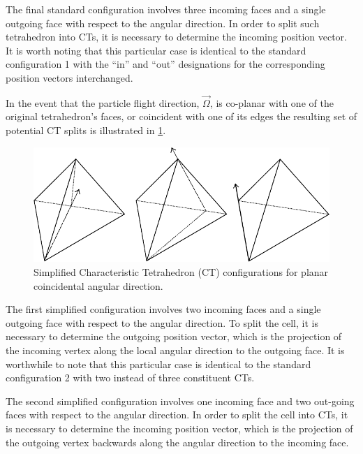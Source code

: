 The final standard configuration involves three incoming faces and a single outgoing face with respect to the angular direction. In order to split such tetrahedron into CTs, it is necessary to determine the incoming position vector. It is worth noting that this particular case is identical to the standard configuration 1 with the “in” and “out” designations for the corresponding position vectors interchanged.

In the event that the particle flight direction, $\vec{\Omega}$, is co-planar with one of the original tetrahedron's faces, or coincident with one of its edges the resulting set of potential CT splits is illustrated in \ref{fig:planar_CTs}.

\begin{figure}[th]
  \includegraphics[width=1.0\textwidth]{chapters/theory/figures/CT_simplified.pdf}
  \caption{Simplified Characteristic Tetrahedron (CT) configurations for planar coincidental angular direction.}
  \label{fig:planar_CTs}
\end{figure}

The first simplified configuration involves two incoming faces and a single outgoing face with respect to the angular direction. To split the cell, it is necessary to determine the outgoing position vector, which is the projection of the incoming vertex along the local angular direction to the outgoing face. It is worthwhile to note that this particular case is identical to the standard configuration 2 with two instead of three constituent CTs.

The second simplified configuration involves one incoming face and two out-going faces with respect to the angular direction. In order to split the cell into CTs, it is necessary to determine the incoming position vector, which is the projection of the outgoing vertex backwards along the angular direction to the incoming face.

